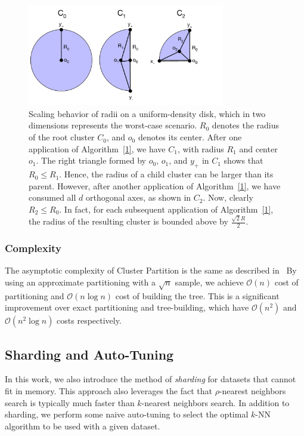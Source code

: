 \begin{figure}[ht!]
    \centering
    \includegraphics[width=3.4in]{images/geometry/geometry.pdf}
    \caption{Scaling behavior of radii on a uniform-density disk, which in two dimensions represents the worst-case scenario. 
    $R_0$ denotes the radius of the root cluster $C_0$, and $o_0$ denotes its center. 
    After one application of Algorithm~\ref{1}, we have $C_1$, with radius $R_1$ and center $o_1$.
    The right triangle formed by $o_0$, $o_1$, and $y_+$ in $C_1$ shows that $R_0 \leq R_1$.
    Hence, the radius of a child cluster can be larger than its parent. However, 
    after another application of Algorithm~\ref{1}, we have consumed all $d$ orthogonal axes, 
    as shown in $C_2$. 
    Now, clearly $R_2 \leq R_0$. In fact, for each subsequent application of Algorithm~\ref{1},
    the radius of the resulting cluster is bounded above by $\frac{\sqrt{2}R}{2}$.}
    \label{fig:methods:scaling_behavior}
\end{figure}

\subsubsection {Complexity}
\label{subsubsec:methods:clustering:complexity}

The asymptotic complexity of Cluster Partition is the same as described in~\cite{ishaq2019clustered}
By using an approximate partitioning with a $\sqrt{n}$ sample, we achieve $\mathcal{O}(n)$ cost of 
partitioning and $\mathcal{O}(n \log n)$ cost of building the tree. This is a significant improvement over 
exact partitioning and tree-building, which have $\mathcal{O}(n^2)$ and $\mathcal{O}(n^2 \log n)$ costs respectively.


\subsection {Sharding and Auto-Tuning}
\label{subsec:methods:index-building}
In this work, we also introduce the method of \emph{sharding} for datasets that cannot fit in memory. 
This approach also leverages the fact that $\rho$-nearest neighbors search is typically much faster than $k$-nearest neighbors search.
In addition to sharding, we perform some naive auto-tuning to select the optimal $k$-NN algorithm to be used with a given dataset. 


